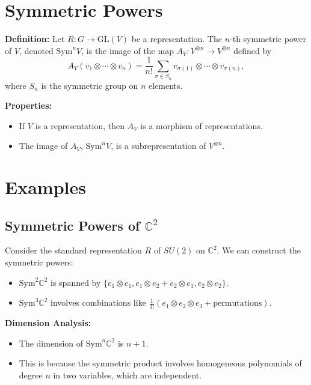 \documentclass{article}
\begin{document}
\section*{Symmetric Powers}

\textbf{Definition:} Let \( R : G \rightarrow \text{GL}(V) \) be a representation. The $n$-th symmetric power of \( V \), denoted \( \text{Sym}^n V \), is the image of the map \( A_V : V^{\otimes n} \rightarrow V^{\otimes n} \) defined by 
\[
A_V (v_1 \otimes \cdots \otimes v_n) = \frac{1}{n!} \sum_{\sigma \in S_n} v_{\sigma(1)} \otimes \cdots \otimes v_{\sigma(n)},
\]
where \( S_n \) is the symmetric group on \( n \) elements.

\textbf{Properties:}
\begin{itemize}
    \item If \( V \) is a representation, then \( A_V \) is a morphism of representations.
    \item The image of \( A_V \), \( \text{Sym}^n V \), is a subrepresentation of \( V^{\otimes n} \).
\end{itemize}

\section*{Examples}
\subsection*{Symmetric Powers of \( \mathbb{C}^2 \)}
Consider the standard representation \( R \) of \( SU(2) \) on \( \mathbb{C}^2 \). We can construct the symmetric powers:
\begin{itemize}
    \item \( \text{Sym}^2 \mathbb{C}^2 \) is spanned by \( \{ e_1 \otimes e_1, e_1 \otimes e_2 + e_2 \otimes e_1, e_2 \otimes e_2 \} \).
    \item \( \text{Sym}^3 \mathbb{C}^2 \) involves combinations like \( \frac{1}{3!}(e_1 \otimes e_2 \otimes e_3 + \text{permutations}) \).
\end{itemize}

\textbf{Dimension Analysis:}
\begin{itemize}
    \item The dimension of \( \text{Sym}^n \mathbb{C}^2 \) is \( n+1 \).
    \item This is because the symmetric product involves homogeneous polynomials of degree \( n \) in two variables, which are independent.
\end{itemize}
\end{document}
